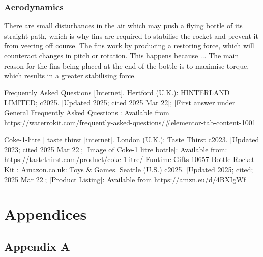 \documentclass[14pt]{article}
\begin{document}
\subsubsection{Aerodynamics}
There are small disturbances in the air which may push a flying bottle of its straight path, which is why fins are required to stabilise the rocket and prevent it from veering off course. The fins work by producing a restoring force, which will counteract changes in pitch or rotation. This happens because ...
The main reason for the fins being placed at the end of the bottle is to maximise torque, which results in a greater stabilising force.
\begin{thebibliography}{0}
Frequently Asked Questions [Internet]. Hertford (U.K.): HINTERLAND LIMITED; c2025. [Updated 2025; cited 2025 Mar 22]; [First answer under General Frequently Asked Questions]: Available from https://waterrokit.com/frequently-asked-questions/\#elementor-tab-content-1001

Coke-1-litre | taste thirst [internet]. London (U.K.): Taste Thirst c2023. [Updated 2023; cited 2025 Mar 22]; [Image of Coke-1 litre bottle]: Available from: https://tastethirst.com/product/coke-1litre/
Funtime Gifts 10657 Bottle Rocket Kit : Amazon.co.uk: Toys \& Games. Seattle (U.S.) c2025. [Updated 2025; cited; 2025 Mar 22]; [Product Listing]: Available from https://amzn.eu/d/4BXIgWf
\end{thebibliography}

\section{Appendices}
\subsection{Appendix A}
\label {Appendix A}
\end{document}

